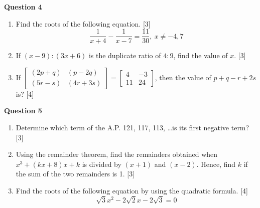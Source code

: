 \newpage
\noindent
\textbf{Question 4}
\begin{enumerate}[label=(\roman*)]

    \item Find the roots of the following equation. \hfill [3]
        \[
            \frac{1}{x+4} - \frac{1}{x-7} = \frac{11}{30},\ x \ne -4, 7
        \]

    \item If $(x-9) : (3x+6)$ is the duplicate ratio of $4:9$, 
        find the value of $x$. \hfill [3]

    \item If $\begin{bmatrix*} (2p+q) & (p-2q) \\ (5r-s) & (4r+3s) \end{bmatrix*} = 
        \begin{bmatrix*} 4 & -3 \\ 11 & 24 \end{bmatrix*}$, then the 
        value of $p + q - r + 2s$ is? \hfill [4]
\end{enumerate}
\vspace{10pt}

\noindent
\textbf{Question 5}
\begin{enumerate}[label=(\roman*)]

    \item Determine which term of the A.P. 121, 117, 113, \dots is 
        its first negative term? \hfill [3]

    \item Using the remainder theorem, find the remainders obtained when 
        $x^3 + (kx+8)x + k$ is divided by $(x+1)$ and $(x-2)$. Hence, 
        find $k$ if the sum of the two remainders is 1. \hfill [3]

    \item Find the roots of the following equation by using 
        the quadratic formula. \hfill [4]
        \[
            \sqrt{3}x^2 - 2\sqrt{2}x - 2\sqrt{3} = 0
        \]

\end{enumerate}

